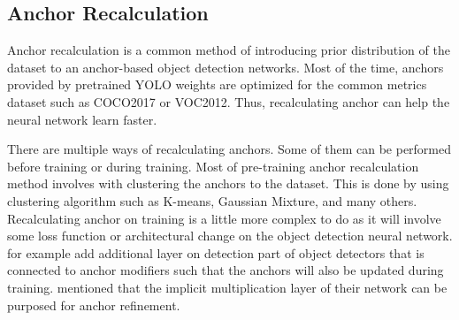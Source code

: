   \subsection{Anchor Recalculation}
  \label{section:anchor_recalc_study}
  Anchor recalculation is a common method of introducing prior distribution of the dataset to an anchor-based object
  detection networks. Most of the time, anchors provided by pretrained YOLO weights are optimized for the common metrics
  dataset such as COCO2017 or VOC2012. Thus, recalculating anchor can help the neural network learn faster.

  There are multiple ways of recalculating anchors. Some of them can be performed before training or during training.
  Most of pre-training anchor recalculation method involves with clustering the anchors to the dataset. This is done by
  using clustering algorithm such as K-means, Gaussian Mixture, and many others. Recalculating anchor on training is 
  a little more complex to do as it will involve some loss function or architectural change on the object detection neural network.
  \textcite{anchoropt} for example add additional layer on detection part of object detectors that is connected to anchor modifiers such that
  the anchors will also be updated during training. \textcite{yolor} mentioned that the implicit multiplication layer of their network
  can be purposed for anchor refinement.



